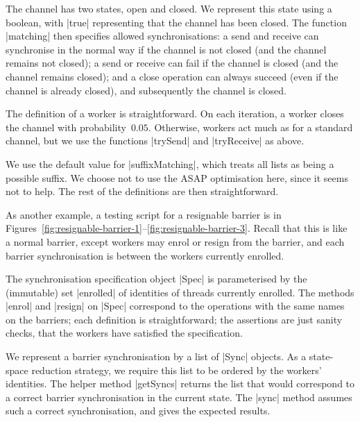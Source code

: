 The channel has two states, open and closed.  We represent this state using a
boolean, with |true| representing that the channel has been closed.  The
function |matching| then specifies allowed synchronisations: a send and
receive can synchronise in the normal way if the channel is not closed (and
the channel remains not closed); a send or receive can fail if the channel is
closed (and the channel remains closed); and a close operation can always
succeed (even if the channel is already closed), and subsequently the channel
is closed.




The definition of a worker is straightforward.  On each iteration, a worker
closes the channel with probability~$0.05$.  Otherwise, workers act much as
for a standard channel, but we use the functions |trySend| and |tryReceive| as
above.

We use the default value for |suffixMatching|, which treats all lists as being
a possible suffix.  We choose not to use the ASAP optimisation here, since it
seems not to help.  The rest of the definitions are then straightforward.



As another example, a testing script for a resignable barrier is in
Figures~\ref{fig:resignable-barrier-1}--\ref{fig:resignable-barrier-3}.
Recall that this is like a normal barrier, except workers may enrol or resign
from the barrier, and each barrier synchronisation is between the workers
currently enrolled.  




The synchronisation specification object |Spec| is parameterised by the
(immutable) set |enrolled| of identities of threads currently enrolled.  The
methods |enrol| and |resign| on |Spec| correspond to the operations with the
same names on the barriers; each definition is straightforward; the assertions
are just sanity checks, that the workers have satisfied the specification.

We represent a barrier synchronisation by a list of |Sync| objects.  As a
state-space reduction strategy, we require this list to be ordered by the
workers' identities.  The helper method |getSyncs| returns the list that would
correspond to a correct barrier synchronisation in the current state.  The
|sync| method assumes such a correct synchronisation, and gives the expected
results. 

